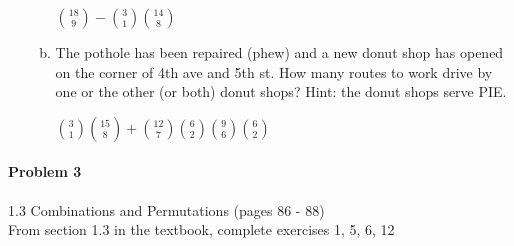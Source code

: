 \documentclass[11pt, a4paper]{article}
\begin{document}
\begin{enumerate}
\begin{enumerate}[(a)]
                    ${18\choose 9} - {3\choose 1}{14\choose 8}$

                \item The pothole has been repaired (phew) and a new donut shop has opened on the corner of 4th ave and 5th st. How many routes to work drive by one or the other (or both) donut shops? Hint: the donut shops serve PIE.

                    ${3\choose 1}{15\choose 8} + {12\choose 7}{6\choose 2}{9\choose 6}{6\choose 2}$
            \end{enumerate}

    \end{enumerate}

	
	\paragraph{Problem 3} 1.3 Combinations and Permutations (pages 86 - 88)\\
	From section 1.3 in the textbook, complete exercises 1, 5, 6, 12
\end{document}

